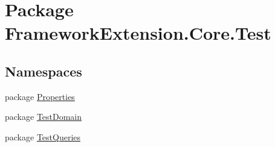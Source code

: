 \hypertarget{namespace_framework_extension_1_1_core_1_1_test}{\section{Package Framework\-Extension.\-Core.\-Test}
\label{namespace_framework_extension_1_1_core_1_1_test}
}
\subsection*{Namespaces}
\begin{DoxyCompactItemize}
\item 
package \hyperlink{namespace_framework_extension_1_1_core_1_1_test_1_1_properties}{Properties}
\item 
package \hyperlink{namespace_framework_extension_1_1_core_1_1_test_1_1_test_domain}{Test\-Domain}
\item 
package \hyperlink{namespace_framework_extension_1_1_core_1_1_test_1_1_test_queries}{Test\-Queries}
\end{DoxyCompactItemize}
